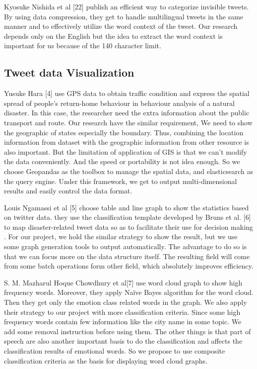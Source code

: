 Kyosuke Nishida et al [22] publish an efficient way to categorize invisible
tweets. By using data compression, they get to handle multilingual tweets in
the same manner and to effectively utilize the word context of the tweet. Our
research depends only on the English but the idea to extract the word context
is important for us because of the 140 character limit. 

\subsection{Tweet data Visualization}
Yusuke Hara [4] use GPS  data to obtain traffic condition and express  the
spatial  spread  of  people’s  return-home  behaviour in behaviour analysis
of a natural disaster. In this case, the researcher need the extra
information about the public transport and route. Our research have the
similar requirement, We need to show the geographic of states especially the
boundary. Thus, combining the location information from dataset with the
geographic information from other resource is also important. But the
limitation of application of GIS is that we can't modify the data
conveniently. And the speed or portability is not idea enough. So we choose
Geopandas as the toolbox to manage the spatial data, and elasticsearch as the
query engine. Under this framework, we get to output multi-dimensional
results and easily control the data format.

Louis Ngamassi et al [5] choose table and line graph to show the statistics
based on twitter data. they use the classification template developed by
Bruns et al. [6] to map disaster-related tweet data so as to facilitate their
use for decision making . For our project, we hold the similar strategy to
show the result, but we use some graph generation tools to output
automatically. The advantage to do so is that we can focus more on the data
structure itself. The resulting field will come from some batch operations
form other field, which absolutely improves efficiency.

S. M. Mazharul Hoque Chowdhury et al[7] use word cloud graph to show high
frequency words. Moreover, they apply Naïve Bayes algorithm for the word
cloud. Then they get only the emotion class related words in the graph. We
also apply their strategy to our project with more classification criteria.
Since some high frequency words contain few information like the city name in
some topic. We add some removal instruction before using them. The other
things is that part of speech are also another important basis to do the
classification and affects the classification results of emotional words. So
we propose to use composite classification criteria as the basis for
displaying word cloud graphs.